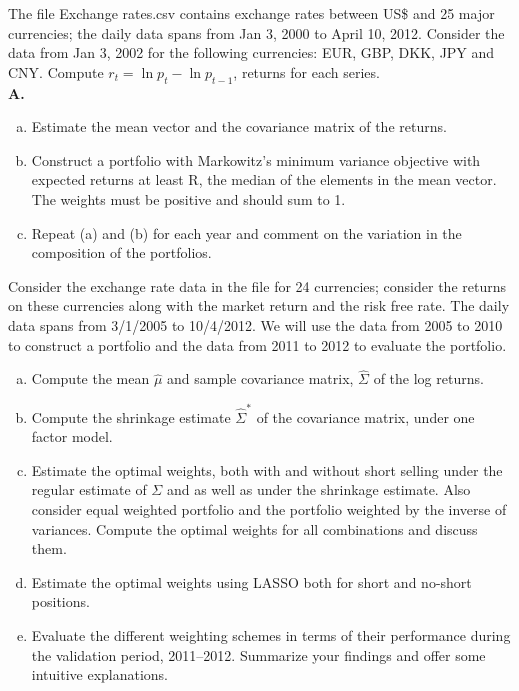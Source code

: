     
\prob The file Exchange rates.csv contains exchange rates between US\$ and 25 major currencies; the daily data spans from Jan 3, 2000 to April 10, 2012. Consider the data from Jan 3, 2002 for the following currencies: EUR, GBP, DKK, JPY and CNY. Compute $r_t = \ln{p_t} - \ln{p_{t-1}}$, returns for each series. \\

\indent\textbf{A. }\begin{minipage}[t]{0.8\linewidth}
	\begin{enumerate}[(a)]
	\item Estimate the mean vector and the covariance matrix of the returns.
	\item Construct a portfolio with Markowitz's minimum variance objective with expected returns at least R, the median of the elements in the mean vector. The weights must be positive and should sum to 1.
	\item Repeat (a) and (b) for each year and comment on the variation in the composition of the portfolios. \twomedskip
	\end{enumerate}
	\end{minipage}


\prob Consider the exchange rate data in the file  for 24 currencies; consider the returns on these currencies along with the market return and the risk free rate. The daily data spans from 3/1/2005 to 10/4/2012. We will use the data from 2005 to 2010 to construct a portfolio and the data from 2011 to 2012 to evaluate the portfolio.
	\begin{enumerate}[(a)]
	\item Compute the mean $\hat{\mu}$ and sample covariance matrix, $\hat{\Sigma}$ of the log returns.
	\item Compute the shrinkage estimate $\hat{\Sigma}^*$ of the covariance matrix, under one factor model.
	\item Estimate the optimal weights, both with and without short selling under the regular estimate of $\Sigma$ and as well as under the shrinkage estimate. Also consider equal weighted portfolio and the portfolio weighted by the inverse of variances. Compute the optimal weights for all combinations and discuss them.
	\item Estimate the optimal weights using LASSO both for short and no-short positions.
	\item Evaluate the different weighting schemes in terms of their performance during the validation period, 2011--2012. Summarize your findings and offer some intuitive explanations. \twomedskip
	\end{enumerate}


